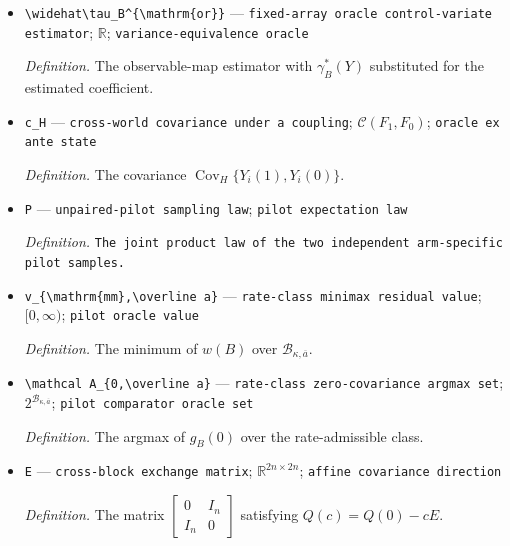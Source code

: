 \documentclass{article}
\begin{document}
\begin{itemize}
  \par\smallskip\noindent\emph{Definition.} The coefficient \((B^{\top}\Omega B)^{-1}B^{\top}\Omega\Pi^{-1}Y\).
  \item \texttt{\textbackslash{}\allowbreak{}widehat\textbackslash{}\allowbreak{}tau\_\allowbreak{}B\textasciicircum{}\{\textbackslash{}\allowbreak{}mathrm\{or\}\allowbreak{}\}\allowbreak{}} --- \texttt{fixed-\allowbreak{}array oracle control-\allowbreak{}variate estimator}; \(\mathbb R\); \texttt{variance-\allowbreak{}equivalence oracle}
  \par\smallskip\noindent\emph{Definition.} The observable-map estimator with \(\gamma_B^*(Y)\) substituted for the estimated coefficient.
  \item \texttt{c\_\allowbreak{}H} --- \texttt{cross-\allowbreak{}world covariance under a coupling}; \(\mathcal C(F_1,F_0)\); \texttt{oracle ex ante state}
  \par\smallskip\noindent\emph{Definition.} The covariance \(\operatorname{Cov}_H\{Y_i(1),Y_i(0)\}\).
  \item \texttt{P} --- \texttt{unpaired-\allowbreak{}pilot sampling law}; \texttt{pilot expectation law}
  \par\smallskip\noindent\emph{Definition.} \texttt{The joint product law of the two independent arm-\allowbreak{}specific pilot samples.}
  \item \texttt{v\_\allowbreak{}\{\textbackslash{}\allowbreak{}mathrm\{mm\}\allowbreak{},\allowbreak{}\textbackslash{}\allowbreak{}overline a\}\allowbreak{}} --- \texttt{rate-\allowbreak{}class minimax residual value}; \([0,\infty)\); \texttt{pilot oracle value}
  \par\smallskip\noindent\emph{Definition.} The minimum of \(w(B)\) over \(\mathcal B_{\kappa,\overline a}\).
  \item \texttt{\textbackslash{}\allowbreak{}mathcal A\_\allowbreak{}\{0,\allowbreak{}\textbackslash{}\allowbreak{}overline a\}\allowbreak{}} --- \texttt{rate-\allowbreak{}class zero-\allowbreak{}covariance argmax set}; \(2^{\mathcal B_{\kappa,\overline a}}\); \texttt{pilot comparator oracle set}
  \par\smallskip\noindent\emph{Definition.} The argmax of \(g_B(0)\) over the rate-admissible class.
  \item \texttt{E} --- \texttt{cross-\allowbreak{}block exchange matrix}; \(\mathbb R^{2n\times2n}\); \texttt{affine covariance direction}
  \par\smallskip\noindent\emph{Definition.} The matrix \(\begin{bmatrix}0&I_n\\I_n&0\end{bmatrix}\) satisfying \(Q(c)=Q(0)-cE\).

\end{itemize}
\end{document}

